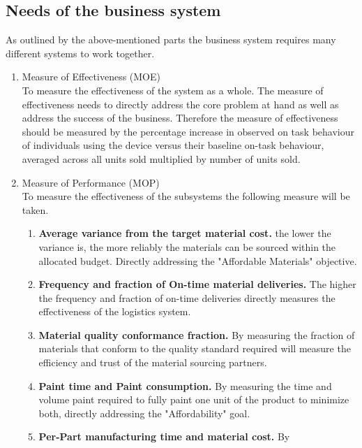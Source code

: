     \subsection{Needs of the business system}
      As outlined by the above-mentioned parts the business system requires many
      different systems to work together. 
      \begin{enumerate}
        \item Measure of Effectiveness (MOE) \\
          To measure the effectiveness of the system as a whole. The measure of
          effectiveness needs to directly address the core problem at hand as
          well as address the success of the business. Therefore the measure of
          effectiveness should be measured by the percentage increase in
          observed on task behaviour of individuals using the device versus
          their baseline on-task behaviour, averaged across all units sold
          multiplied by number of units sold.
        \item Measure of Performance (MOP) \\
          To measure the effectiveness of the subsystems the following measure
          will be taken.
          \begin{enumerate}
            \item \textbf{Average variance from the target material cost. }
              the lower the variance is, the more reliably the materials can be
              sourced within the allocated budget. Directly addressing the
              "Affordable Materials" objective. 
            \item \textbf{Frequency and fraction of On-time material
              deliveries.} The higher the frequency and fraction of on-time
              deliveries directly measures the effectiveness of the logistics
              system. 
            \item \textbf{Material quality conformance fraction.} By measuring
              the fraction of materials that conform to the quality standard
              required will measure the efficiency and trust of the material
              sourcing partners.
            \item \textbf{Paint time and Paint consumption.} By measuring the
              time and volume paint required to fully paint one unit of the
              product to minimize both, directly addressing the "Affordability"
              goal.
            \item \textbf{Per-Part manufacturing time and material cost.} By

\end{enumerate}
\end{enumerate}

